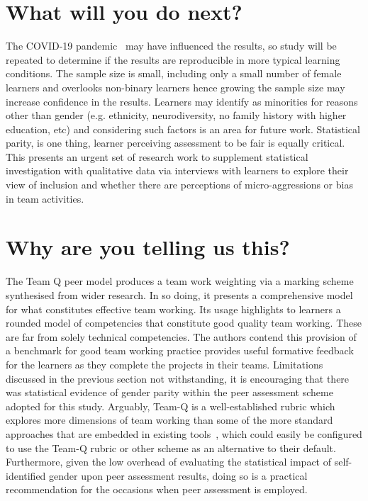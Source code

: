 \documentclass[sigconf, anonymous=false]{acmart}
\begin{document}
\section{What will you do next?}
The COVID-19 pandemic~\cite{crick-et-al:ukicer2020} may have influenced the results, so study will be repeated to determine if the results are reproducible in more typical learning conditions.  The sample size is small, including only a small number of female learners and overlooks non-binary learners hence growing the sample size may increase confidence in the results.   Learners may identify as minorities for reasons other than gender (e.g. ethnicity, neurodiversity, no family history with higher education, etc) and considering such factors is an area for future work. Statistical parity, is one thing, learner perceiving assessment to be fair is equally critical. This presents an urgent set of research work to supplement statistical investigation with qualitative data via interviews with learners to explore their view of inclusion and whether there are perceptions of micro-aggressions or bias in team activities.

\section{Why are you telling us this?}
The Team Q peer model produces a team work weighting via a marking scheme synthesised from wider research. In so doing, it presents a
comprehensive model for what constitutes effective team working. Its usage highlights to learners a rounded model of competencies that constitute good quality team working. These are far
from solely technical competencies. The authors contend this provision
of a benchmark for good team working practice provides useful
formative feedback for the learners as they complete the projects in
their teams.
Limitations discussed in the previous section not withstanding, it is encouraging that there was statistical evidence of gender parity within the
peer assessment scheme adopted for this study. Arguably, Team-Q is a well-established
rubric which explores more dimensions of team working than some of the
more standard approaches that are embedded in existing
tools~\cite{WebPA,BuddyCheck,SparkPlus}, which could
easily be configured to use the Team-Q rubric or other scheme as an
alternative to their default. Furthermore, given the low overhead of
evaluating the statistical impact of self-identified gender upon peer assessment
results, doing so is a practical recommendation for the occasions when
peer assessment is employed. 


\end{document}
